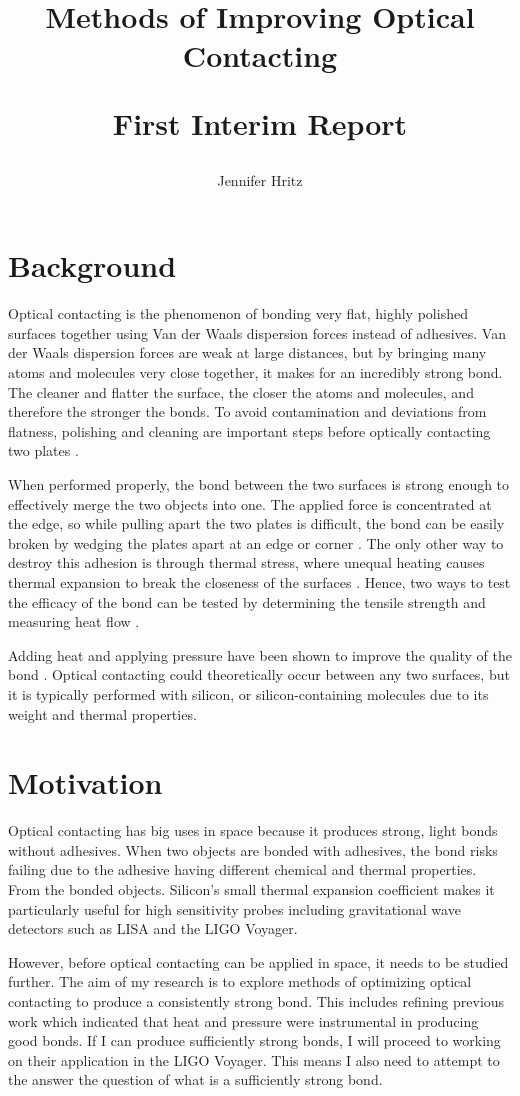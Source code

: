 \documentclass[colorlinks=true,pdfstartview=FitV,linkcolor=blue,
            citecolor=red,urlcolor=magenta]{ligodoc}
\title{Methods of Improving Optical Contacting

First Interim Report}
\author{Jennifer Hritz}
\begin{document}
\section{Background} 
Optical contacting is the phenomenon of bonding very flat, highly polished surfaces together using Van der Waals dispersion forces instead of adhesives. Van der Waals dispersion forces are weak at large distances, but by bringing many atoms and molecules very close together, it makes for an incredibly strong bond. The cleaner and flatter the surface, the closer the atoms and molecules, and therefore the stronger the bonds. To avoid contamination and deviations from flatness, polishing and cleaning are important steps before optically contacting two plates \cite{Wright}.

When performed properly, the bond between the two surfaces is strong enough to effectively merge the two objects into one. The applied force is concentrated at the edge, so while pulling apart the two plates is difficult, the bond can be easily broken by wedging the plates apart at an edge or corner \cite{Rayleigh}. The only other way to destroy this adhesion is through thermal stress, where unequal heating causes thermal expansion to break the closeness of the surfaces \cite{Ferme}. Hence, two ways to test the efficacy of the bond can be tested by determining the tensile strength and measuring heat flow \cite{Wright, Zawada}.

Adding heat and applying pressure have been shown to improve the quality of the bond \cite{Zawada}. Optical contacting could theoretically occur between any two surfaces, but it is typically performed with silicon, or silicon-containing molecules due to its weight and thermal properties.

\section{Motivation} 
Optical contacting has big uses in space because it produces strong, light bonds without adhesives. When two objects are bonded with adhesives, the bond risks failing due to the adhesive having different chemical and thermal properties. From the bonded objects. Silicon’s small thermal expansion coefficient makes it particularly useful for high sensitivity probes \cite{Wright} including gravitational wave detectors such as LISA and the LIGO Voyager.

However, before optical contacting can be applied in space, it needs to be studied further. The aim of my research is to explore methods of optimizing optical contacting to produce a consistently strong bond. This includes refining previous work which indicated that heat and pressure were instrumental in producing good bonds. If I can produce sufficiently strong bonds, I will proceed to working on their application in the LIGO Voyager. This means I also need to attempt to the answer the question of what is a sufficiently strong bond.
\end{document}
